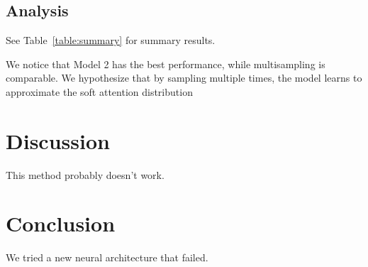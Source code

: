 \documentclass[11pt]{report}
\begin{document}
\section{Analysis}

See Table~\ref{table:summary} for summary results.


We notice that Model 2 has the best performance, while multisampling is comparable. We hypothesize that by sampling multiple times, the model learns to approximate the soft attention distribution 

\chapter{Discussion}

This method probably doesn't work.

\chapter{Conclusion}

We tried a new neural architecture that failed.



\end{document}
